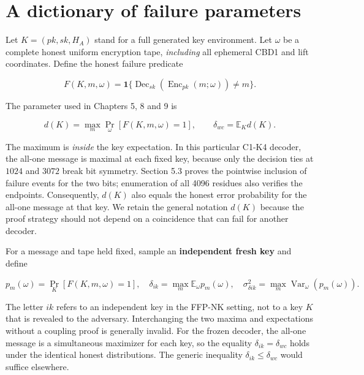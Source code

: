 \documentclass[
  11pt,
  a4paper,
  oneside]{report}
\begin{document}
\section{A dictionary of failure
parameters}\label{a-dictionary-of-failure-parameters}

Let \(K=(pk,sk,H_A)\) stand for a full generated key environment. Let
\(\omega\) be a complete honest uniform encryption tape,
\emph{including} all ephemeral CBD1 and lift coordinates. Define the
honest failure predicate

\[
F(K,m,\omega)=
\mathbf1\{\operatorname{Dec}_{sk}(\operatorname{Enc}_{pk}(m;\omega))\ne m\}.
\]

The parameter used in Chapters 5, 8 and 9 is

\[
d(K)=\max_m\Pr_\omega[F(K,m,\omega)=1],
\qquad
\delta_{wc}=\mathbb E_K d(K).
\]

The maximum is \emph{inside} the key expectation. In this particular
C1-K4 decoder, the all-one message is maximal at each fixed key, because
only the decision ties at \(1024\) and \(3072\) break bit symmetry.
Section 5.3 proves the pointwise inclusion of failure events for the two
bits; enumeration of all 4096 residues also verifies the endpoints.
Consequently, \(d(K)\) also equals the honest error probability for the
all-one message at that key. We retain the general notation \(d(K)\)
because the proof strategy should not depend on a coincidence that can
fail for another decoder.

For a message and tape held fixed, sample an \textbf{independent fresh
key} and define

\[
p_m(\omega)=\Pr_K[F(K,m,\omega)=1],
\quad
\delta_{ik}=\max_m\mathbb E_{\omega}p_m(\omega),
\quad
\sigma_{\delta ik}^2=
\max_m\operatorname{Var}_{\omega}(p_m(\omega)).
\]

The letter \(ik\) refers to an independent key in the FFP-NK setting,
not to a key \(K\) that is revealed to the adversary. Interchanging the
two maxima and expectations without a coupling proof is generally
invalid. For the frozen decoder, the all-one message is a simultaneous
maximizer for each key, so the equality \(\delta_{ik}=\delta_{wc}\)
holds under the identical honest distributions. The generic inequality
\(\delta_{ik}\le\delta_{wc}\) would suffice elsewhere.
\end{document}
